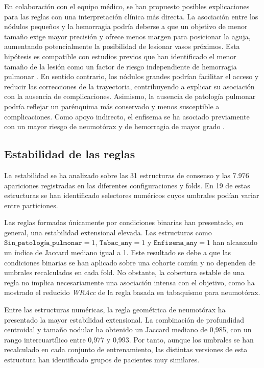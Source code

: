 En colaboración con el equipo médico, se han propuesto posibles explicaciones para las reglas con una interpretación clínica más directa. La asociación entre los nódulos pequeños y la hemorragia podría deberse a que un objetivo de menor tamaño exige mayor precisión y ofrece menos margen para posicionar la aguja, aumentando potencialmente la posibilidad de lesionar vasos próximos. Esta hipótesis es compatible con estudios previos que han identificado el menor tamaño de la lesión como un factor de riesgo independiente de hemorragia pulmonar \cite{Zhu2020}. En sentido contrario, los nódulos grandes podrían facilitar el acceso y reducir las correcciones de la trayectoria, contribuyendo a explicar su asociación con la ausencia de complicaciones. Asimismo, la ausencia de patología pulmonar podría reflejar un parénquima más conservado y menos susceptible a complicaciones. Como apoyo indirecto, el enfisema se ha asociado previamente con un mayor riesgo de neumotórax y de hemorragia de mayor grado \cite{Zhao2017}.

\subsection{Estabilidad de las reglas}

La estabilidad se ha analizado sobre las 31 estructuras de consenso y las 7.976 apariciones registradas en las diferentes configuraciones y folds. En 19 de estas estructuras se han identificado selectores numéricos cuyos umbrales podían variar entre particiones.

Las reglas formadas únicamente por condiciones binarias han presentado, en general, una estabilidad extensional elevada. Las estructuras como \(\texttt{Sin\_patología\_pulmonar}=1\), \(\texttt{Tabac\_any}=1\) y \(\texttt{Enfisema\_any}=1\) han alcanzado un índice de Jaccard mediano igual a 1. Este resultado se debe a que las condiciones binarias se han aplicado sobre una cohorte común y no dependen de umbrales recalculados en cada fold. No obstante, la cobertura estable de una regla no implica necesariamente una asociación intensa con el objetivo, como ha mostrado el reducido \textit{WRAcc} de la regla basada en tabaquismo para neumotórax.

Entre las estructuras numéricas, la regla geométrica de neumotórax ha presentado la mayor estabilidad extensional. La combinación de profundidad centroidal y tamaño nodular ha obtenido un Jaccard mediano de 0,985, con un rango intercuartílico entre 0,977 y 0,993. Por tanto, aunque los umbrales se han recalculado en cada conjunto de entrenamiento, las distintas versiones de esta estructura han identificado grupos de pacientes muy similares.


